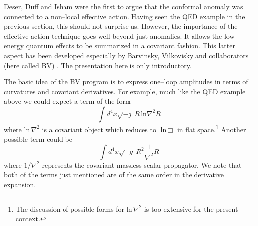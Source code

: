 \documentclass[11pt,a4paper]{article}
\newcommand{\be}{\begin{equation}}
\newcommand{\ee}{\end{equation}}
\begin{document}
Deser, Duff and Isham \cite{Deser:1976yx} were the first to argue that the conformal anomaly was connected to a non--local effective action. Having seen the QED example in the previous section, this should not surprise us. However, the importance of the effective action technique goes well beyond just anomalies. It allows the low--energy quantum effects to be summarized in a covariant fashion. This latter aspect has been developed especially by Barvinsky, Vilkovisky and collaborators (here called BV) \cite{Barvinsky:1985an, Barvinsky:1993en, Buchbinder:1992rb}. The presentation here is only introductory.

The basic idea of the BV program is to express one--loop amplitudes in terms of curvatures and covariant derivatives. For example, much like the QED example above we could expect a term of the form
\be
\int d^4x \sqrt{-g} ~ R \,\text{ln} \nabla^2 R
\ee
where $\text{ln}\, \nabla^2 $ is a covariant object which reduces to $\text{ln}\, \Box$ in flat space.\footnote{The discussion of possible forms for $\text{ln}\, \nabla^2$ is too extensive for the present context.} Another possible term could be
\be
\int d^4x \sqrt{-g} ~ R^2 \frac{1}{\nabla^2} R
\label{thirdorder}
\ee
where $1/\nabla^2$ represents the covariant massless scalar propagator. We note that both of the terms just mentioned are of the same order in the derivative expansion.
\end{document}
